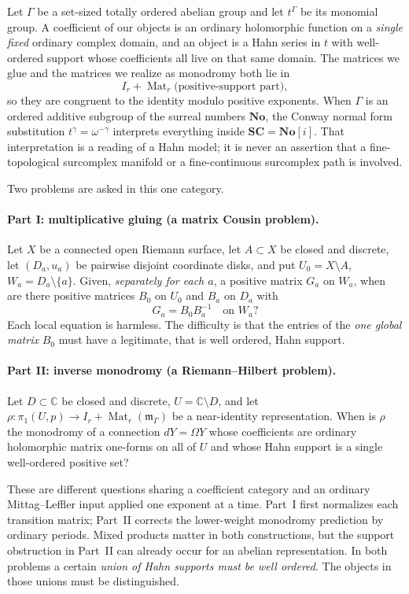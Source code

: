 \documentclass[11pt,letterpaper]{article}
\theoremstyle{definition}
\theoremstyle{remark}
\newcommand{\C}{\mathbb C}
\newcommand{\No}{\mathbf{No}}
\newcommand{\SC}{\mathbf{SC}}
\newcommand{\mm}{\mathfrak m_\Gamma}
\newcommand{\Mat}{\operatorname{Mat}}
\numberwithin{equation}{section}
\begin{document}
Let $\Gamma$ be a set-sized totally ordered abelian group and let
$t^\Gamma$ be its monomial group. A coefficient of our objects is an ordinary
holomorphic function on a \emph{single fixed} ordinary complex domain, and an
object is a Hahn series in $t$ with well-ordered support whose coefficients
all live on that same domain. The matrices we glue and the matrices we realize
as monodromy both lie in
\[
 I_r+\Mat_r\bigl(\text{positive-support part}\bigr),
\]
so they are congruent to the identity modulo positive exponents. When
$\Gamma$ is an ordered additive subgroup of the surreal numbers $\No$, the
Conway normal form substitution $t^\gamma=\omega^{-\gamma}$ interprets
everything inside $\SC=\No[i]$. That interpretation is a reading of a Hahn
model; it is never an assertion that a fine-topological surcomplex manifold or
a fine-continuous surcomplex path is involved.

Two problems are asked in this one category.

\paragraph{Part I: multiplicative gluing (a matrix Cousin problem).}
Let $X$ be a connected open Riemann surface, let $A\subset X$ be closed and
discrete, let $(D_a,u_a)$ be pairwise disjoint coordinate disks, and put
$U_0=X\setminus A$, $W_a=D_a\setminus\{a\}$. Given, \emph{separately for each
$a$}, a positive matrix $G_a$ on $W_a$, when are there positive matrices
$B_0$ on $U_0$ and $B_a$ on $D_a$ with
\begin{equation}\label{nab:eq:splitintro}
 G_a=B_0B_a^{-1}\quad\text{on }W_a?
\end{equation}
Each local equation is harmless. The difficulty is that the entries of the
\emph{one global matrix} $B_0$ must have a legitimate, that is well ordered,
Hahn support.

\paragraph{Part II: inverse monodromy (a Riemann--Hilbert problem).}
Let $D\subset\C$ be closed and discrete, $U=\C\setminus D$, and let
$\rho:\pi_1(U,p)\to I_r+\Mat_r(\mm)$ be a near-identity representation. When
is $\rho$ the monodromy of a connection $dY=\Omega Y$ whose coefficients are
ordinary holomorphic matrix one-forms on all of $U$ and whose Hahn support is
a single well-ordered positive set?

These are different questions sharing a coefficient category and an ordinary
Mittag--Leffler input applied one exponent at a time. Part~I first normalizes
each transition matrix; Part~II corrects the lower-weight monodromy prediction
by ordinary periods. Mixed products matter in both constructions, but the
support obstruction in Part~II can already occur for an abelian
representation. In both problems a certain \emph{union of Hahn supports must
be well ordered}. The objects in those unions must be distinguished.
\end{document}
